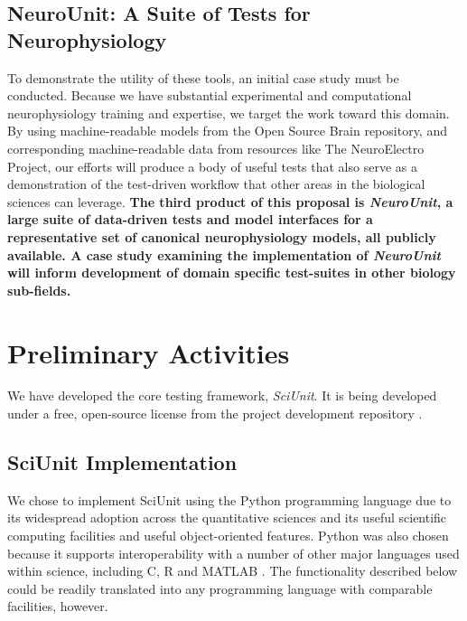 \documentclass[11pt,letterpaper]{article}
\begin{document}
\subsection{NeuroUnit: A Suite of Tests for Neurophysiology}\label{sec:neurounit}
To demonstrate the utility of these tools, an initial case study must be conducted. Because we have substantial experimental and computational neurophysiology training and expertise, we target the work toward this domain. By using machine-readable models from the Open Source Brain repository, and corresponding machine-readable data from resources like The NeuroElectro Project, our efforts will produce a body of useful tests that also serve as a demonstration of the test-driven workflow that other areas in the biological sciences can leverage.  \textbf{The third product of this proposal is \textit{NeuroUnit}, a large suite of data-driven tests and model interfaces for a representative set of canonical neurophysiology models, all publicly available. A case study examining the implementation of \textit{NeuroUnit} will inform development of domain specific test-suites in other biology sub-fields.}

\section{Preliminary Activities}
We have developed the core testing framework, \textit{SciUnit}. It is being developed under a free, open-source license from the project development repository \cite{sciunit_url}.  

\subsection{SciUnit Implementation} We chose to implement SciUnit using the Python programming language \cite{python} due to its widespread adoption across the quantitative sciences and its useful scientific computing facilities and useful object-oriented features. Python was also chosen because it supports interoperability with a number of other major languages used within science, including C, R \cite{r_url}  and MATLAB \cite{matlab_url}. The functionality described below could be readily translated into any programming language with comparable facilities, however.
\end{document}
